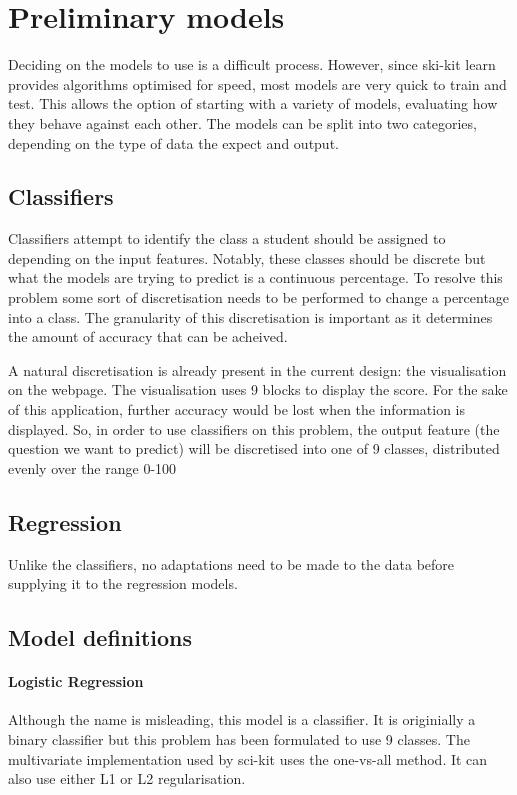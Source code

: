 \section{Preliminary models}
Deciding on the models to use is a difficult process. However, since ski-kit learn provides algorithms optimised for speed, most models are very quick to train and test. This allows the option of starting with a variety of models, evaluating how they behave against each other. The models can be split into two categories, depending on the type of data the expect and output.

\subsection{Classifiers}
Classifiers attempt to identify the class a student should be assigned to depending on the input features. Notably, these classes should be discrete but what the models are trying to predict is a continuous percentage. To resolve this problem some sort of discretisation needs to be performed to change a percentage into a class. The granularity of this discretisation is important as it determines the amount of accuracy that can be acheived. 

A natural discretisation is already present in the current design: the visualisation on the webpage. The visualisation uses 9 blocks to display the score. For the sake of this application, further accuracy would be lost when the information is displayed. So, in order to use classifiers on this problem, the output feature (the question we want to predict) will be discretised into one of 9 classes, distributed evenly over the range 0-100%

\subsection{Regression}
Unlike the classifiers, no adaptations need to be made to the data before supplying it to the regression models.

\subsection{Model definitions}

\paragraph{Logistic Regression}
Although the name is misleading, this model is a classifier. It is originially a binary classifier but this problem has been formulated to use 9 classes. The multivariate implementation used by sci-kit uses the one-vs-all method. It can also use either L1 or L2 regularisation.

